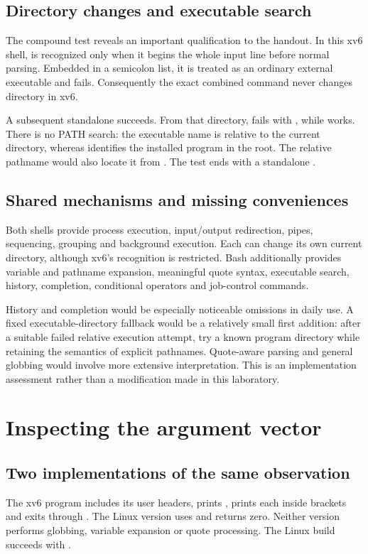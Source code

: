 \documentclass{../latex/utmreport}
\begin{document}
\section{Directory changes and executable search}
The compound  test reveals an important qualification
to the handout. In this xv6 shell,  is recognized only when it begins the
whole input line before normal parsing. Embedded in a semicolon list, it is treated
as an ordinary external executable and fails. Consequently the exact combined
command never changes directory in xv6.

A subsequent standalone  succeeds. From that directory,
 fails with , while  works.
There is no PATH search: the executable name  is relative to the current
directory, whereas  identifies the installed program in the root.
The relative pathname  would also locate it from .
The test ends with a standalone .

\section{Shared mechanisms and missing conveniences}
Both shells provide process execution, input/output redirection, pipes, sequencing,
grouping and background execution. Each can change its own current directory,
although xv6's recognition is restricted. Bash additionally provides variable and
pathname expansion, meaningful quote syntax, executable search, history, completion,
conditional operators and job-control commands.

History and completion would be especially noticeable omissions in daily use.
A fixed executable-directory fallback would be a relatively small first addition:
after a suitable failed relative execution attempt, try a known program directory
while retaining the semantics of explicit pathnames. Quote-aware parsing and general
globbing would involve more extensive interpretation. This is an implementation
assessment rather than a modification made in this laboratory.

\chapter{Inspecting the argument vector}
\section{Two implementations of the same observation}
The xv6 program includes its user headers, prints , prints each
 inside brackets and exits through . The Linux version
uses  and returns zero. Neither version performs globbing, variable
expansion or quote processing. The Linux build succeeds with
.
\end{document}
